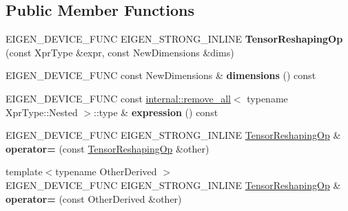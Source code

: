 \subsection*{Public Member Functions}
\begin{DoxyCompactItemize}
\item 
\mbox{\label{class_eigen_1_1_tensor_reshaping_op_aa51a6c82ee858f8b63ff291553e613e9}} 
E\+I\+G\+E\+N\+\_\+\+D\+E\+V\+I\+C\+E\+\_\+\+F\+U\+NC E\+I\+G\+E\+N\+\_\+\+S\+T\+R\+O\+N\+G\+\_\+\+I\+N\+L\+I\+NE {\bfseries Tensor\+Reshaping\+Op} (const Xpr\+Type \&expr, const New\+Dimensions \&dims)
\item 
\mbox{\label{class_eigen_1_1_tensor_reshaping_op_abb6c67d981c8e9d7fcfd205a739194ea}} 
E\+I\+G\+E\+N\+\_\+\+D\+E\+V\+I\+C\+E\+\_\+\+F\+U\+NC const New\+Dimensions \& {\bfseries dimensions} () const
\item 
\mbox{\label{class_eigen_1_1_tensor_reshaping_op_a4763364964a00cfc3e7944c5a18ca8d1}} 
E\+I\+G\+E\+N\+\_\+\+D\+E\+V\+I\+C\+E\+\_\+\+F\+U\+NC const \hyperlink{struct_eigen_1_1internal_1_1remove__all}{internal\+::remove\+\_\+all}$<$ typename Xpr\+Type\+::\+Nested $>$\+::type \& {\bfseries expression} () const
\item 
\mbox{\label{class_eigen_1_1_tensor_reshaping_op_a547537227250e333d19cec6890e12203}} 
E\+I\+G\+E\+N\+\_\+\+D\+E\+V\+I\+C\+E\+\_\+\+F\+U\+NC E\+I\+G\+E\+N\+\_\+\+S\+T\+R\+O\+N\+G\+\_\+\+I\+N\+L\+I\+NE \hyperlink{class_eigen_1_1_tensor_reshaping_op}{Tensor\+Reshaping\+Op} \& {\bfseries operator=} (const \hyperlink{class_eigen_1_1_tensor_reshaping_op}{Tensor\+Reshaping\+Op} \&other)
\item 
\mbox{\label{class_eigen_1_1_tensor_reshaping_op_a2de9e2546cf0437dafde7ec2442531a5}} 
{\footnotesize template$<$typename Other\+Derived $>$ }\\E\+I\+G\+E\+N\+\_\+\+D\+E\+V\+I\+C\+E\+\_\+\+F\+U\+NC E\+I\+G\+E\+N\+\_\+\+S\+T\+R\+O\+N\+G\+\_\+\+I\+N\+L\+I\+NE \hyperlink{class_eigen_1_1_tensor_reshaping_op}{Tensor\+Reshaping\+Op} \& {\bfseries operator=} (const Other\+Derived \&other)
\item 
\mbox{\label{class_eigen_1_1_tensor_reshaping_op_aa51a6c82ee858f8b63ff291553e613e9}} 

\end{DoxyCompactItemize}
